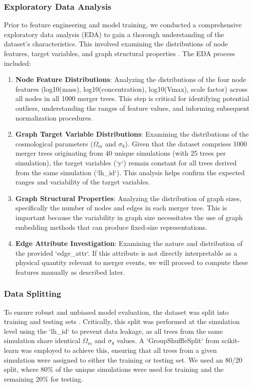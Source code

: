 \documentclass[twocolumn]{aastex631}
\begin{document}
\subsubsection{Exploratory Data Analysis}
Prior to feature engineering and model training, we conducted a comprehensive exploratory data analysis (EDA) to gain a thorough understanding of the dataset's characteristics.
This involved examining the distributions of node features, target variables, and graph structural properties \citep{haghighi2023analyzingastronomicaldatamachine}.
The EDA process included:
\begin{enumerate}
    \item \textbf{Node Feature Distributions}: Analyzing the distributions of the four node features (log10(mass), log10(concentration), log10(Vmax), scale factor) across all nodes in all 1000 merger trees. This step is critical for identifying potential outliers, understanding the ranges of feature values, and informing subsequent normalization procedures.
    \item \textbf{Graph Target Variable Distributions}: Examining the distributions of the cosmological parameters ($\Omega_m$ and $\sigma_8$). Given that the dataset comprises 1000 merger trees originating from 40 unique simulations (with 25 trees per simulation), the target variables (`y`) remain constant for all trees derived from the same simulation (`lh\_id`). This analysis helps confirm the expected ranges and variability of the target variables.
    \item \textbf{Graph Structural Properties}: Analyzing the distribution of graph sizes, specifically the number of nodes and edges in each merger tree. This is important because the variability in graph size necessitates the use of graph embedding methods that can produce fixed-size representations.
    \item \textbf{Edge Attribute Investigation}: Examining the nature and distribution of the provided `edge\_attr`. If this attribute is not directly interpretable as a physical quantity relevant to merger events, we will proceed to compute these features manually as described later.
\end{enumerate}
\citep{kent2017editorialtechniquesmethodsastrophysical,giri2025astronomycalcpythontoolkitteaching}

\subsubsection{Data Splitting}
To ensure robust and unbiased model evaluation, the dataset was split into training and testing sets \citep{frailis2004perspectsastrophysicaldatabases,onose2016scalablesplittingalgorithmsbigdata}. Critically, this split was performed at the simulation level using the `lh\_id` to prevent data leakage, as all trees from the same simulation share identical $\Omega_m$ and $\sigma_8$ values. A `GroupShuffleSplit` from scikit-learn was employed to achieve this, ensuring that all trees from a given simulation were assigned to either the training or testing set. We used an 80/20 split, where 80\% of the unique simulations were used for training and the remaining 20\% for testing.
\end{document}
